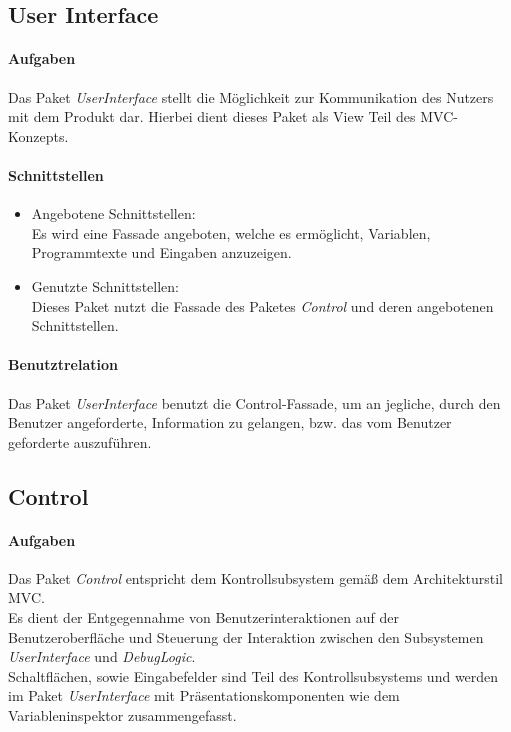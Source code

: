 ﻿\documentclass[parskip=full]{scrartcl}
\begin{document}
\newpage

\subsection{User Interface}
\paragraph{Aufgaben} Das Paket \textit{UserInterface} stellt die Möglichkeit zur Kommunikation des Nutzers mit dem Produkt dar. Hierbei dient dieses Paket als View Teil des MVC-Konzepts.
\paragraph{Schnittstellen} 
\begin{itemize}
\item Angebotene Schnittstellen:\\
Es wird eine Fassade angeboten, welche es ermöglicht, Variablen, Programmtexte und Eingaben anzuzeigen.
\item Genutzte Schnittstellen:\\
Dieses Paket nutzt die Fassade des Paketes \textit{Control} und deren angebotenen Schnittstellen.
\end{itemize}
\paragraph{Benutztrelation} Das Paket \textit{UserInterface} benutzt die Control-Fassade, um an jegliche, durch den Benutzer angeforderte, Information zu gelangen, bzw. das vom Benutzer geforderte auszuführen. %


\subsection{Control}
\paragraph{Aufgaben}
    Das Paket \textit{Control} entspricht dem Kontrollsubsystem gemäß dem Architekturstil MVC.\\
    Es dient der Entgegennahme von Benutzerinteraktionen auf der Benutzeroberfläche und Steuerung der Interaktion zwischen den
    Subsystemen \textit{UserInterface} und \textit{DebugLogic}.\\
    Schaltflächen, sowie Eingabefelder sind Teil des Kontrollsubsystems und werden im Paket 
    \textit{UserInterface} mit Präsentationskomponenten wie dem Variableninspektor zusammengefasst.\\
\end{document}
